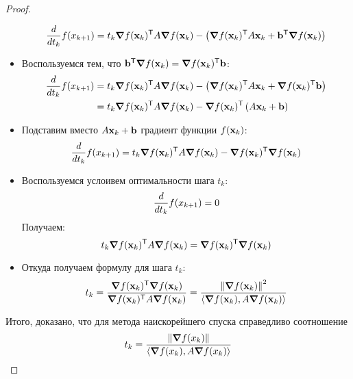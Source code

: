 \begin{proof}
\begin{itemize}
              \[
                  \dv{t_k} f(x_{k+1})
                  = t_k \grad{f(\vb{x}_k)}^{\mathsf{T}} A \grad{f(\vb{x}_k)}
                  - \left(\grad{f(\vb{x}_k)}^{\mathsf{T}} A \vb{x}_k
                  + \vb{b}^{\mathsf{T}} \grad{f(\vb{x}_k)}\right)
              \]
        \item Воспользуемся тем, что $\vb{b}^{\mathsf{T}} \grad{f(\vb{x}_k)} = \grad{f(\vb{x}_k)}^{\mathsf{T}} \vb{b}$:
              \[
                  \begin{aligned}
                      \dv{t_k} f(x_{k+1})
                       & =  t_k \grad{f(\vb{x}_k)}^{\mathsf{T}} A \grad{f(\vb{x}_k)}
                      - \left(\grad{f(\vb{x}_k)}^{\mathsf{T}} A \vb{x}_k
                      + \grad{f(\vb{x}_k)}^{\mathsf{T}} \vb{b}\right)
                      \\
                       & =  t_k \grad{f(\vb{x}_k)}^{\mathsf{T}} A \grad{f(\vb{x}_k)}
                      - \grad{f(\vb{x}_k)}^{\mathsf{T}}\left( A \vb{x}_k
                      +  \vb{b}\right)
                      \\
                  \end{aligned}
              \]
        \item Подставим вместо $A\vb{x}_k + \vb{b}$ градиент функции $f(\vb{x}_k)$:
              \[
                  \dv{t_k} f(x_{k+1})
                  = t_k \grad{f(\vb{x}_k)}^{\mathsf{T}} A \grad{f(\vb{x}_k)}
                  - \grad{f(\vb{x}_k)}^{\mathsf{T}} \grad{f(\vb{x}_k)}
              \]
        \item Воспользуемся услоивем оптимальности шага $t_k$:
              \[
                  \dv{t_k} f(x_{k+1}) = 0
              \]
              Получаем:
              \[
                  t_k \grad{f(\vb{x}_k)}^{\mathsf{T}} A \grad{f(\vb{x}_k)}
                  = \grad{f(\vb{x}_k)}^{\mathsf{T}} \grad{f(\vb{x}_k)}
              \]
        \item Откуда получаем формулу для шага $t_k$:
              \[
                  t_k
                  = \frac{\grad{f(\vb{x}_k)}^{\mathsf{T}} \grad{f(\vb{x}_k)}}{\grad{f(\vb{x}_k)}^{\mathsf{T}} A \grad{f(\vb{x}_k)}}
                  = \frac{\norm{\grad{f(\vb{x}_k)}}^2}{\left\langle \grad{f(\vb{x}_k)}, A \grad{f(\vb{x}_k)}  \right\rangle}
              \]
    \end{itemize}
    Итого, доказано, что для метода наискорейшего спуска справедливо соотношение
    \[
        t_k = \frac{\norm{\grad {f(x_k)}}}{\left\langle \grad{f(x_k)},  A \grad{ f(x_k)}  \right\rangle}
    \]
\end{proof}

